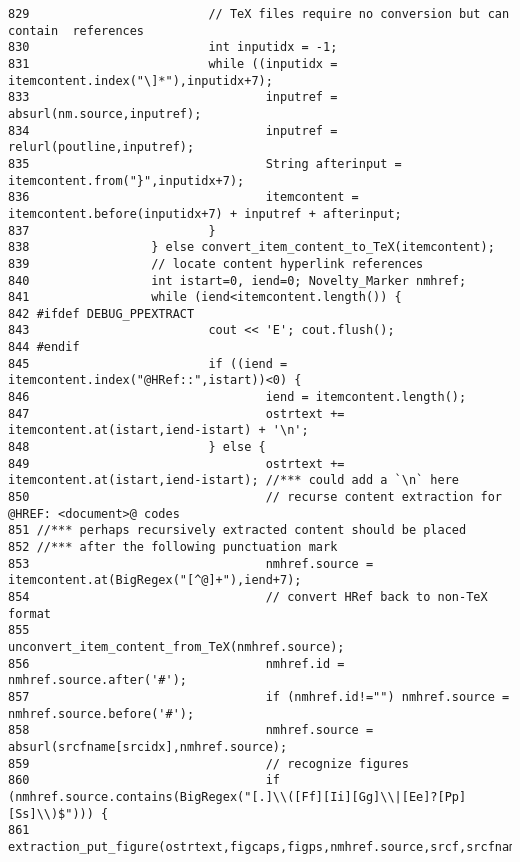 \begin{verbatim}
829                         // TeX files require no conversion but can contain  references
830                         int inputidx = -1;
831                         while ((inputidx = itemcontent.index("\]*"),inputidx+7);
833                                 inputref = absurl(nm.source,inputref);
834                                 inputref = relurl(poutline,inputref);
835                                 String afterinput = itemcontent.from("}",inputidx+7);
836                                 itemcontent = itemcontent.before(inputidx+7) + inputref + afterinput;
837                         }
838                 } else convert_item_content_to_TeX(itemcontent);
839                 // locate content hyperlink references
840                 int istart=0, iend=0; Novelty_Marker nmhref;
841                 while (iend<itemcontent.length()) {
842 #ifdef DEBUG_PPEXTRACT
843                         cout << 'E'; cout.flush();
844 #endif
845                         if ((iend = itemcontent.index("@HRef::",istart))<0) {
846                                 iend = itemcontent.length();
847                                 ostrtext += itemcontent.at(istart,iend-istart) + '\n';
848                         } else {
849                                 ostrtext += itemcontent.at(istart,iend-istart); //*** could add a `\n` here
850                                 // recurse content extraction for @HREF: <document>@ codes
851 //*** perhaps recursively extracted content should be placed
852 //*** after the following punctuation mark
853                                 nmhref.source = itemcontent.at(BigRegex("[^@]+"),iend+7);
854                                 // convert HRef back to non-TeX format
855                                 unconvert_item_content_from_TeX(nmhref.source);
856                                 nmhref.id = nmhref.source.after('#');
857                                 if (nmhref.id!="") nmhref.source = nmhref.source.before('#');
858                                 nmhref.source = absurl(srcfname[srcidx],nmhref.source);
859                                 // recognize figures
860                                 if (nmhref.source.contains(BigRegex("[.]\\([Ff][Ii][Gg]\\|[Ee]?[Pp][Ss]\\)$"))) {
861                                         extraction_put_figure(ostrtext,figcaps,figps,nmhref.source,srcf,srcfname,srcfnum,poutline);

\end{verbatim}
